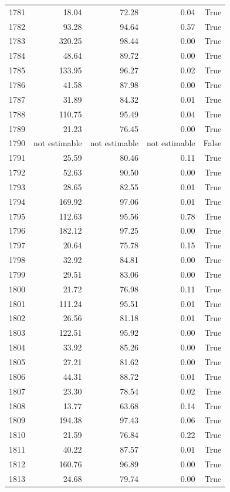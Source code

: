 \begin{longtable}{rrrrr}
1781 & 18.04 & 72.28 & 0.04 & True \\
1782 & 93.28 & 94.64 & 0.57 & True \\
1783 & 320.25 & 98.44 & 0.00 & True \\
1784 & 48.64 & 89.72 & 0.00 & True \\
1785 & 133.95 & 96.27 & 0.02 & True \\
1786 & 41.58 & 87.98 & 0.00 & True \\
1787 & 31.89 & 84.32 & 0.01 & True \\
1788 & 110.75 & 95.49 & 0.04 & True \\
1789 & 21.23 & 76.45 & 0.00 & True \\
1790 & not estimable & not estimable & not estimable & False \\
1791 & 25.59 & 80.46 & 0.11 & True \\
1792 & 52.63 & 90.50 & 0.00 & True \\
1793 & 28.65 & 82.55 & 0.01 & True \\
1794 & 169.92 & 97.06 & 0.01 & True \\
1795 & 112.63 & 95.56 & 0.78 & True \\
1796 & 182.12 & 97.25 & 0.00 & True \\
1797 & 20.64 & 75.78 & 0.15 & True \\
1798 & 32.92 & 84.81 & 0.00 & True \\
1799 & 29.51 & 83.06 & 0.00 & True \\
1800 & 21.72 & 76.98 & 0.11 & True \\
1801 & 111.24 & 95.51 & 0.01 & True \\
1802 & 26.56 & 81.18 & 0.01 & True \\
1803 & 122.51 & 95.92 & 0.00 & True \\
1804 & 33.92 & 85.26 & 0.00 & True \\
1805 & 27.21 & 81.62 & 0.00 & True \\
1806 & 44.31 & 88.72 & 0.01 & True \\
1807 & 23.30 & 78.54 & 0.02 & True \\
1808 & 13.77 & 63.68 & 0.14 & True \\
1809 & 194.38 & 97.43 & 0.06 & True \\
1810 & 21.59 & 76.84 & 0.22 & True \\
1811 & 40.22 & 87.57 & 0.01 & True \\
1812 & 160.76 & 96.89 & 0.00 & True \\
1813 & 24.68 & 79.74 & 0.00 & True \\

\end{longtable}

